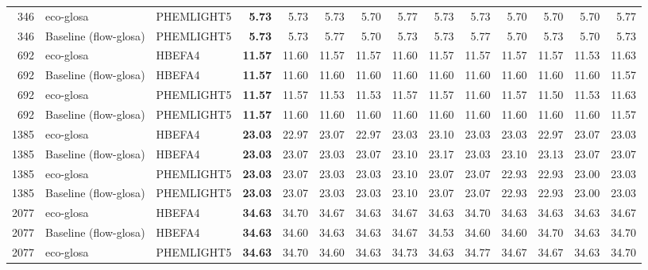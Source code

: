 \begin{table}[htb]
{\begin{tabular}{r l l r *{10}{r}}
    346  & \ac{eco-glosa}              & PHEMLIGHT5       & \textbf{5.73} & 5.73  & 5.73  & 5.70  & 5.77  & 5.73  & 5.73  & 5.70  & 5.70  & 5.70  & 5.77  \\
    346  & Baseline (\ac{flow-glosa})  & PHEMLIGHT5       & \textbf{5.73} & 5.73  & 5.77  & 5.70  & 5.73  & 5.73  & 5.77  & 5.70  & 5.73  & 5.70  & 5.73  \\
    \midrule
    692  & \ac{eco-glosa}              & HBEFA4           & \textbf{11.57} & 11.60 & 11.57 & 11.57 & 11.60 & 11.57 & 11.57 & 11.57 & 11.57 & 11.53 & 11.63 \\
    692  & Baseline (\ac{flow-glosa})  & HBEFA4           & \textbf{11.57} & 11.60 & 11.60 & 11.60 & 11.60 & 11.60 & 11.60 & 11.60 & 11.60 & 11.60 & 11.57 \\
    692  & \ac{eco-glosa}              & PHEMLIGHT5       & \textbf{11.57} & 11.57 & 11.53 & 11.53 & 11.57 & 11.57 & 11.60 & 11.57 & 11.50 & 11.53 & 11.63 \\
    692  & Baseline (\ac{flow-glosa})  & PHEMLIGHT5       & \textbf{11.57} & 11.60 & 11.60 & 11.60 & 11.60 & 11.60 & 11.60 & 11.60 & 11.60 & 11.60 & 11.57 \\
    \midrule
    1385 & \ac{eco-glosa}              & HBEFA4           & \textbf{23.03} & 22.97 & 23.07 & 22.97 & 23.03 & 23.10 & 23.03 & 23.03 & 22.97 & 23.07 & 23.03 \\
    1385 & Baseline (\ac{flow-glosa})  & HBEFA4           & \textbf{23.03} & 23.07 & 23.03 & 23.07 & 23.10 & 23.17 & 23.03 & 23.10 & 23.13 & 23.07 & 23.07 \\
    1385 & \ac{eco-glosa}              & PHEMLIGHT5       & \textbf{23.03} & 23.07 & 23.03 & 23.03 & 23.10 & 23.07 & 23.07 & 22.93 & 22.93 & 23.00 & 23.03 \\
    1385 & Baseline (\ac{flow-glosa})  & PHEMLIGHT5       & \textbf{23.03} & 23.07 & 23.03 & 23.03 & 23.10 & 23.07 & 23.07 & 22.93 & 22.93 & 23.00 & 23.03 \\
    \midrule
    2077 & \ac{eco-glosa}              & HBEFA4           & \textbf{34.63} & 34.70 & 34.67 & 34.63 & 34.67 & 34.63 & 34.70 & 34.63 & 34.63 & 34.63 & 34.67 \\
    2077 & Baseline (\ac{flow-glosa})  & HBEFA4           & \textbf{34.63} & 34.60 & 34.63 & 34.63 & 34.67 & 34.53 & 34.60 & 34.60 & 34.70 & 34.63 & 34.70 \\
    2077 & \ac{eco-glosa}              & PHEMLIGHT5       & \textbf{34.63} & 34.70 & 34.60 & 34.63 & 34.73 & 34.63 & 34.77 & 34.67 & 34.67 & 34.63 & 34.70 \\

\end{tabular}}
\end{table}
